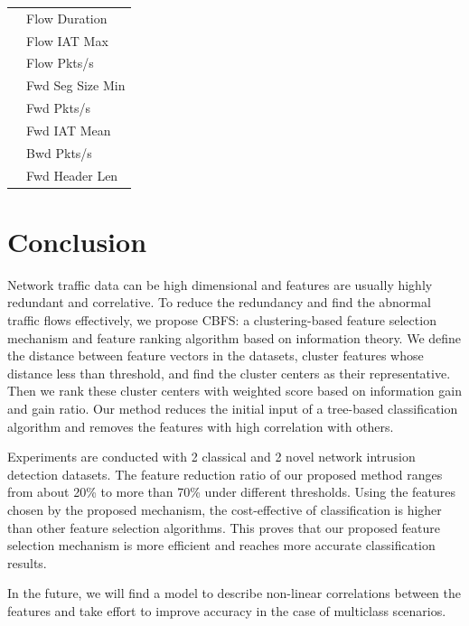 \documentclass{ieeeaccess}
\theoremstyle{definition}
\begin{document}
\begin{table}[htbp]
\begin{tabular}{ll}
            & Flow Duration \\
            & Flow IAT Max \\
            & Flow Pkts/s \\
            & Fwd Seg Size Min \\
            & Fwd Pkts/s \\
            & Fwd IAT Mean \\
            & Bwd Pkts/s \\
            & Fwd Header Len \\
        \bottomrule
        \end{tabular}%
    \label{tab:selected-features}%
\end{table}%


\section{Conclusion}
\label{sec:conclusion}

Network traffic data can be high dimensional and features are usually highly redundant and correlative. To reduce the redundancy and find the abnormal traffic flows effectively, we propose CBFS: a clustering-based feature selection mechanism and feature ranking algorithm based on information theory. We define the distance between feature vectors in the datasets, cluster features whose distance less than threshold, and find the cluster centers as their representative. Then we rank these cluster centers with weighted score based on information gain and gain ratio. Our method reduces the initial input of a tree-based classification algorithm and removes the features with high correlation with others. 

Experiments are conducted with 2 classical and 2 novel network intrusion detection datasets. The feature reduction ratio of our proposed method ranges from about 20\% to more than 70\% under different thresholds. Using the features chosen by the proposed mechanism, the cost-effective of classification is higher than other feature selection algorithms. This proves that our proposed feature selection mechanism is more efficient and reaches more accurate classification results. 

In the future, we will find a model to describe non-linear correlations between the features and take effort to improve accuracy in the case of multiclass scenarios. 
\end{document}
